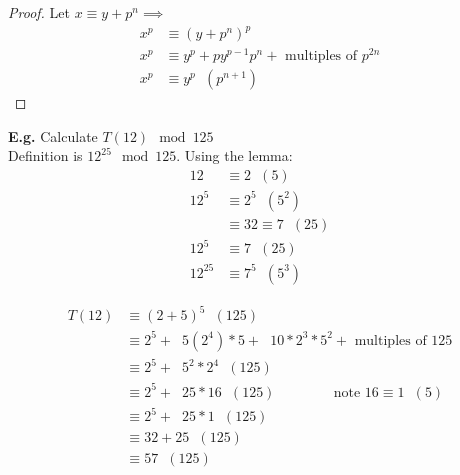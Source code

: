 \documentclass[11pt]{article}
\begin{document}
\begin{proof}
Let $ x \equiv y + p^n \implies $
	\begin{align*}
		x^p &\equiv (y + p^n)^p\\[1em]
		x^p &\equiv y^p + py^{p-1}p^n + \text{ multiples of } p^{2n}\\[1em]
		x^p &\equiv y^p \hspace{7pt} (p^{n+1})
	\end{align*}
\end{proof}

\newpage

\textbf{E.g.} Calculate $T(12) \mod 125$\\[1em]
Definition is $12^{25} \mod 125$. Using the lemma:
\begin{align*}
	12 &\equiv 2 \hspace{7pt} (5)\\[1em]
	12^5 &\equiv 2^5 \hspace{7pt} (5^2)\\
	&\equiv 32 \equiv 7  \hspace{7pt} (25)\\
	12^5 &\equiv 7\hspace{7pt}  (25)\\[1em]
	12^{25} &\equiv 7^5 \hspace{7pt}  (5^3)
\end{align*}

\begin{align*}
	T(12) &\equiv (2+5)^5 \hspace{7pt} (125)\\
	&\equiv 2^5 +\hspace{7pt}  5(2^4)*5  + \hspace{7pt} 10*2^3*5^2 + \text{ multiples of 125}\\
	&\equiv 2^5 +\hspace{7pt} 5^2*2^4 \hspace{7pt} (125)\\
	&\equiv 2^5 + \hspace{7pt} 25*16 \hspace{7pt} (125)  \hspace{50pt}\text{note }  16 \equiv 1 \hspace{7pt} (5)\\
	&\equiv 2^5 + \hspace{7pt} 25*1 \hspace{7pt} (125)\\
	&\equiv 32 + 25 \hspace{7pt} (125)\\
	&\equiv 57 \hspace{7pt} (125)
\end{align*}
\end{document}
